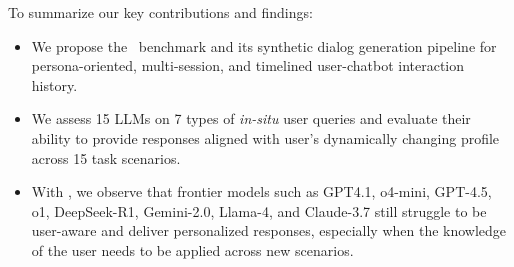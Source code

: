 To summarize our key contributions and findings:
\begin{itemize}[itemsep=2pt, left=0pt]
\vspace{-2mm}
\item We propose the \datasetnameemoji~benchmark and its synthetic dialog generation pipeline for persona-oriented, multi-session, and timelined user-chatbot interaction history. 
\item We assess 15 LLMs on 7 types of \textit{in-situ} user queries and evaluate their ability to provide responses aligned with user's dynamically changing profile across 15 task scenarios.    
\item With \datasetname, we observe that frontier models such as GPT4.1, o4-mini, GPT-4.5, o1, DeepSeek-R1, Gemini-2.0, Llama-4, and Claude-3.7 still struggle to be user-aware and deliver personalized responses, especially when the knowledge of the user needs to be applied across new scenarios. 
\end{itemize}



